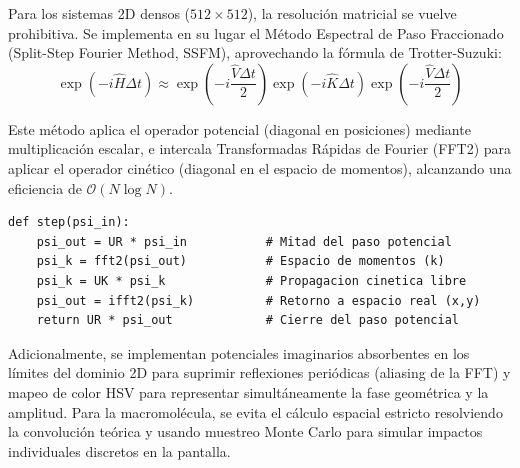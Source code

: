 
Para los sistemas 2D densos ($512 \times 512$), la resolución matricial se vuelve prohibitiva. Se implementa en su lugar el Método Espectral de Paso Fraccionado (Split-Step Fourier Method, SSFM), aprovechando la fórmula de Trotter-Suzuki:
\begin{equation}
    \exp(-i \hat{H} \Delta t) \approx \exp\left(-i \frac{\hat{V} \Delta t}{2}\right) \exp(-i \hat{K} \Delta t) \exp\left(-i \frac{\hat{V} \Delta t}{2}\right)
\end{equation}

Este método aplica el operador potencial (diagonal en posiciones) mediante multiplicación escalar, e intercala Transformadas Rápidas de Fourier (FFT2) para aplicar el operador cinético (diagonal en el espacio de momentos), alcanzando una eficiencia de $\mathcal{O}(N \log N)$. 

\begin{lstlisting}[caption={Núcleo iterativo del método espectral SSFM para el dominio 2D.}, label={lst:ssfm}]
def step(psi_in):
    psi_out = UR * psi_in           # Mitad del paso potencial
    psi_k = fft2(psi_out)           # Espacio de momentos (k)
    psi_k = UK * psi_k              # Propagacion cinetica libre
    psi_out = ifft2(psi_k)          # Retorno a espacio real (x,y)
    return UR * psi_out             # Cierre del paso potencial
\end{lstlisting}

Adicionalmente, se implementan potenciales imaginarios absorbentes en los límites del dominio 2D para suprimir reflexiones periódicas (aliasing de la FFT) y mapeo de color HSV para representar simultáneamente la fase geométrica y la amplitud. Para la macromolécula, se evita el cálculo espacial estricto resolviendo la convolución teórica y usando muestreo Monte Carlo para simular impactos individuales discretos en la pantalla.